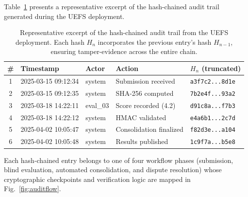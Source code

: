 \documentclass[preprint,12pt,a4paper]{elsarticle}
\begin{document}
Table~\ref{tab:auditsample} presents a representative excerpt of the hash-chained audit trail generated during the UEFS deployment.

\begin{table}[H]
\centering
\footnotesize
\begin{tabular}{|c|l|l|l|l|}
\hline
\textbf{\#} & \textbf{Timestamp} & \textbf{Actor} & \textbf{Action} & \textbf{$H_n$ (truncated)} \\
\hline
1 & 2025-03-15 09:12:34 & system & Submission received & \texttt{a3f7c2...8d1e} \\
\hline
2 & 2025-03-15 09:12:35 & system & SHA-256 computed & \texttt{7b2e4f...93a2} \\
\hline
3 & 2025-03-18 14:22:11 & eval\_03 & Score recorded (4.2) & \texttt{d91c8a...f7b3} \\
\hline
4 & 2025-03-18 14:22:12 & system & HMAC validated & \texttt{e4a6b1...2c7d} \\
\hline
5 & 2025-04-02 10:05:47 & system & Consolidation finalized & \texttt{f82d3e...a104} \\
\hline
6 & 2025-04-02 10:05:48 & system & Results published & \texttt{1c9f7a...b5e8} \\
\hline
\end{tabular}
\caption{Representative excerpt of the hash-chained audit trail from the UEFS deployment. Each hash $H_n$ incorporates the previous entry's hash $H_{n-1}$, ensuring tamper-evidence across the entire chain.}
\label{tab:auditsample}
\end{table}

Each hash-chained entry belongs to one of four workflow phases (submission, blind evaluation, automated consolidation, and dispute resolution) whose cryptographic checkpoints and verification logic are mapped in Fig.~\ref{fig:auditflow}.
\end{document}

